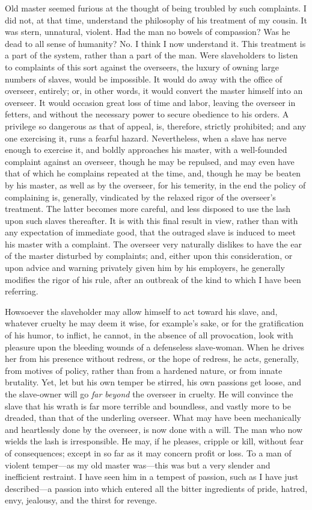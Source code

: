Old master seemed furious at the thought of being troubled by such
complaints. I did not, at that time, understand the philosophy of his
treatment of my cousin. It was stern, unnatural, violent. Had the man no
bowels of compassion? Was he dead to all sense of humanity? No. I think
I now understand it. This treatment is a part of the system, rather than
a part of the man. Were slaveholders to listen to complaints of this
sort against the overseers, the luxury of owning large numbers of
slaves, would be impossible. It would do away with the office of
overseer, entirely; or, in other words, it would convert the master
himself into an overseer. It would occasion great loss of time and
labor, leaving the overseer in fetters, and without the necessary power
to secure obedience to his orders. A privilege so dangerous as that of
appeal, is, therefore, strictly prohibited; and any one exercising it,
runs a fearful hazard. Nevertheless, when a slave has nerve enough to
exercise it, and boldly approaches his master, with a well-founded
{}complaint against an overseer, though he may be repulsed, and may even
have that of which he complains repeated at the time, and, though he may
be beaten by his master, as well as by the overseer, for his temerity,
in the end the policy of complaining is, generally, vindicated by the
relaxed rigor of the overseer's treatment. The latter becomes more
careful, and less disposed to use the lash upon such slaves thereafter.
It is with this final result in view, rather than with any expectation
of immediate good, that the outraged slave is induced to meet his master
with a complaint. The overseer very naturally dislikes to have the ear
of the master disturbed by complaints; and, either upon this
consideration, or upon advice and warning privately given him by his
employers, he generally modifies the rigor of his rule, after an
outbreak of the kind to which I have been referring.

Howsoever the slaveholder may allow himself to act toward his slave,
and, whatever cruelty he may deem it wise, for example's sake, or for
the gratification of his humor, to inflict, he cannot, in the absence of
all provocation, look with pleasure upon the bleeding wounds of a
defenseless slave-woman. When he drives her from his presence without
redress, or the hope of redress, he acts, generally, from motives of
policy, rather than from a hardened nature, or from innate brutality.
Yet, let but his own temper be stirred, his own passions get loose, and
the slave-owner will go \emph{far beyond} the overseer in cruelty. He
will convince the slave that his wrath is far more terrible and
boundless, and vastly more to be dreaded, than that of the underling
overseer. What may have been {}mechanically and heartlessly done by the
overseer, is now done with a will. The man who now wields the lash is
irresponsible. He may, if he pleases, cripple or kill, without fear of
consequences; except in so far as it may concern profit or loss. To a
man of violent temper---as my old master was---this was but a very
slender and inefficient restraint. I have seen him in a tempest of
passion, such as I have just described---a passion into which entered
all the bitter ingredients of pride, hatred, envy, jealousy, and the
thirst for revenge.

